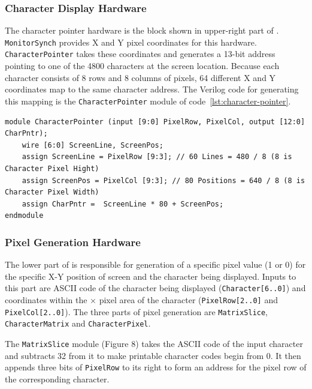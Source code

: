 \documentclass[12pt, logo=tehranDLDL/ut]{tehranDLDL}
\begin{document}
\subsubsection{Character Display Hardware}

The character pointer hardware is the block shown in upper-right part of . \lstinline{MonitorSynch} provides X and Y pixel coordinates for this hardware. \lstinline{CharacterPointer} takes these coordinates and generates a 13-bit address pointing to one of the 4800 characters at the screen location. Because each character consists of 8 rows and 8 columns of pixels, 64 different X and Y coordinates map to the same character address. The Verilog code for generating this mapping is the \lstinline{CharacterPointer} module of code~\ref{lst:character-pointer}.

\begin{lstlisting}[caption={Finding character position from a pixel position\label{lst:character-pointer}}]
module CharacterPointer (input [9:0] PixelRow, PixelCol, output [12:0] CharPntr);
    wire [6:0] ScreenLine, ScreenPos;
    assign ScreenLine = PixelRow [9:3]; // 60 Lines = 480 / 8 (8 is Character Pixel Hight)
    assign ScreenPos = PixelCol [9:3]; // 80 Positions = 640 / 8 (8 is Character Pixel Width)
    assign CharPntr =  ScreenLine * 80 + ScreenPos;
endmodule
\end{lstlisting}

\subsubsection{Pixel Generation Hardware}

The lower part of  is responsible for generation of a specific pixel value (1 or 0) for the specific X-Y position of screen and the character being displayed. Inputs to this part are ASCII code of the character being displayed (\lstinline{Character[6..0]}) and coordinates within the $\times$ pixel area of the character (\lstinline{PixelRow[2..0]} and \lstinline{PixelCol[2..0]}). The three parts of pixel generation are \lstinline{MatrixSlice}, \lstinline{CharacterMatrix} and \lstinline{CharacterPixel}.

The \lstinline{MatrixSlice} module (Figure 8) takes the ASCII code of the input character and subtracts 32 from it to make printable character codes begin from 0. It then appends three bits of \lstinline{PixelRow} to its right to form an address for the pixel row of the corresponding character.
\end{document}
